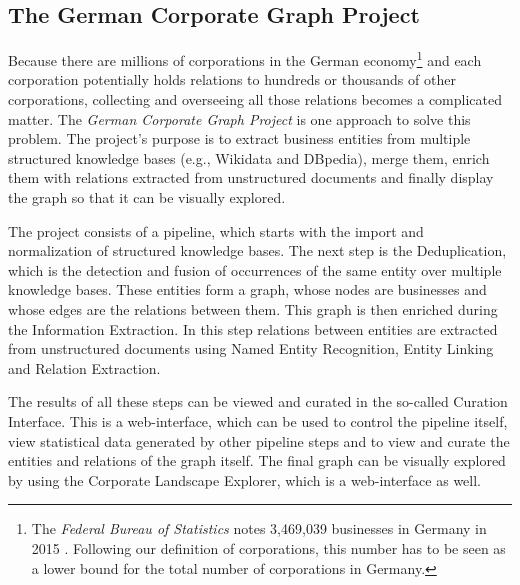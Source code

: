 \subsection*{The German Corporate Graph Project}
Because there are millions of corporations in the German economy\footnote{ The \emph{Federal Bureau of Statistics} notes 3,469,039 businesses in Germany in 2015 \cite{destatis1}. Following our definition of corporations, this number has to be seen as a lower bound for the total number of corporations in Germany.} and each corporation potentially holds relations to hundreds or thousands of other corporations, collecting and overseeing all those relations becomes a complicated matter. The \emph{German Corporate Graph Project} is one approach to solve this problem. The project's purpose is to extract business entities from multiple structured knowledge bases (e.g., Wikidata and DBpedia), merge them, enrich them with relations extracted from unstructured documents and finally display the graph so that it can be visually explored.\par
The project consists of a pipeline, which starts with the import and normalization of structured knowledge bases. The next step is the Deduplication, which is the detection and fusion of occurrences of the same entity over multiple knowledge bases. These entities form a graph, whose nodes are businesses and whose edges are the relations between them. This graph is then enriched during the Information Extraction. In this step relations between entities are extracted from unstructured documents using Named Entity Recognition, Entity Linking and Relation Extraction.\par
The results of all these steps can be viewed and curated in the so-called Curation Interface. This is a web-interface, which can be used to control the pipeline itself, view statistical data generated by other pipeline steps and to view and curate the entities and relations of the graph itself. The final graph can be visually explored by using the Corporate Landscape Explorer, which is a web-interface as well.\par

